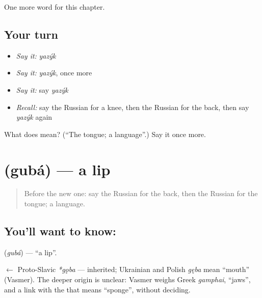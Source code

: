 \begin{grammarlens}[title={What you've built}]
One more word for this chapter.
\end{grammarlens}

\subsection*{Your turn}
\begin{itemize}
\raggedright
  \item \emph{Say it:} \emph{yazýk}
  \item \emph{Say it:} \emph{yazýk}, once more
  \item \emph{Say it:} say \emph{yazýk}
  \item \emph{Recall:} say the Russian for a knee, then the Russian for the back, then say \emph{yazýk} again
\end{itemize}

\begin{tcolorbox}[breakable,colback=teal!4,colframe=teal!35!black,title={Before you move on}]
What does  mean? (\textquotedblleft{}The tongue; a language\textquotedblright{}.) Say it once more.
\end{tcolorbox}
\section[\texorpdfstring{\ru{губа} (gubá)}{губа (gubá)}]{ (gubá) — a lip}

\label{lesson:RU-C31-lip}



\begin{quote}
Before the new one: say the Russian for the back, then the Russian for the tongue; a language.
\end{quote}

\subsection*{You'll want to know: }
\textbf{} (\emph{gubá}) — \textquotedblleft{}a lip\textquotedblright{}.

\begin{cousinweb}
\textbf{} $\leftarrow$ Proto-Slavic \emph{*gǫba} — inherited; Ukrainian \emph{} and Polish \emph{gęba} mean \textquotedblleft{}mouth\textquotedblright{} (Vasmer). The deeper origin is unclear: Vasmer weighs Greek \emph{gamphai}, \textquotedblleft{}jaws\textquotedblright{}, and a link with the \emph{} that means \textquotedblleft{}sponge\textquotedblright{}, without deciding.
\end{cousinweb}

